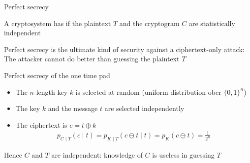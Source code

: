 \begin{parag}{Perfect secrecy}
    \begin{definition}
        A cryptosystem has  if the plaintext $T$ and the cryptogram $C$ are statistically independent
    \end{definition}
    Perfect secrecy is the ultimate kind of security against a ciphertext-only attack: The attacker cannot do better than guessing the plaintext $T$

\end{parag}
\begin{parag}{Perfect secrecy of the one time pad}
    \begin{itemize}
        \item The $n$-length key $k$ is selected at random (uniform distribution ober $\{0,1\}^n$)
        \item The key $k$ and the message $t$ are selected independently
        \item The ciphertext is $c = t \oplus k$
           \begin{align*}
               p_{C \mid  T}( c \mid  t) = p_{K \mid  T}( c \ominus t \mid  t) = p_K ( c \ominus t ) = \frac{1}{2^n}
           \end{align*}
    \end{itemize}
    Hence $C$ and $T$ are independent: knowledge of $C$ is useless in guessing $T$
\end{parag}
